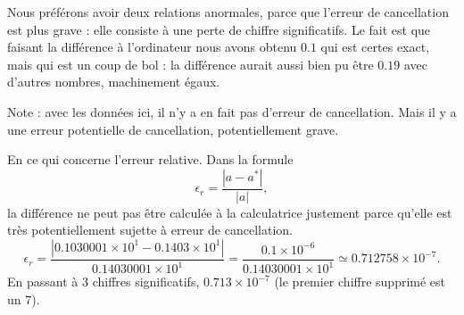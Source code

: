 \begin{example}
	Nous préférons avoir deux relations anormales, parce que l'erreur de cancellation est plus grave : elle consiste à une perte de chiffre significatifs. Le fait est que faisant la différence à l'ordinateur nous avons obtenu \( 0.1\) qui est certes exact, mais qui est un coup de bol : la différence aurait aussi bien pu être \(0.19\) avec d'autres nombres, machinement égaux.

	Note : avec les données ici, il n'y a en fait pas d'erreur de cancellation. Mais il y a une erreur potentielle de cancellation, potentiellement grave.

	En ce qui concerne l'erreur relative. Dans la formule
	\begin{equation}
		\epsilon_r=\frac{ | a-a^* | }{ | a | },
	\end{equation}
	la différence ne peut pas être calculée à la calculatrice justement parce qu'elle est très potentiellement sujette à erreur de cancellation.
	\begin{equation}
		\epsilon_r=\frac{ | 0.1030001\times 10^1-0.1403\times 10^1 | }{ 0.14030001\times 10^1 }=\frac{ 0.1\times 10^{-6} }{ 0.14030001\times 10^1 }\simeq 0.712758\times 10^{-7}.
	\end{equation}
	En passant à \( 3\) chiffres significatifs, \( 0.713\times 10^{-7}\) (le premier chiffre supprimé est un \( 7\)).

\end{example}

